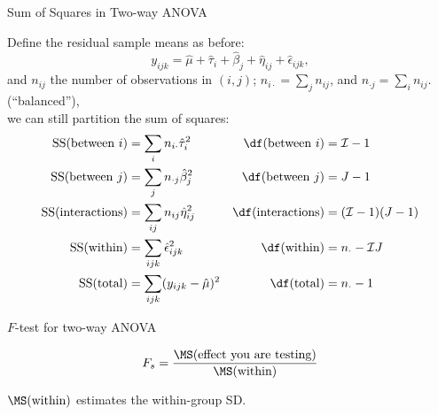 \begin{frame}{Sum of Squares in Two-way ANOVA}

  Define the residual sample means as before:
    \[
    y_{ijk} = \hat \mu + \hat \tau_i + \hat \beta_j + \hat \eta_{ij} + \hat \epsilon_{ijk} ,
    \]
    and $n_{ij}$ the number of observations in $(i,j)$; 
    $n_{i\cdot} = \sum_j n_{ij}$, and 
    $n_{\cdot j} = \sum_i n_{ij}$.
     (``balanced''),\\
    we can still partition the sum of squares:
  \begin{align*}
      \SS(\text{between $i$}) &= \sum_{i} n_{i\cdot} \hat \tau_{i}^2 & \df(\text{between $i$}) &= \mathcal{I}-1 \\
    \SS(\text{between $j$}) &= \sum_{j} n_{\cdot j} \hat \beta_{j}^2 & \df(\text{between $j$}) &= J-1 \\
      \SS(\text{interactions}) &= \sum_{ij} n_{ij} \hat \eta_{ij}^2  & \df(\text{interactions}) &= (\mathcal{I}-1)(J-1) \\
      \SS(\text{within}) &= \sum_{ijk} \hat \epsilon_{ijk}^2  & \df(\text{within}) &= n_{\cdot} - \mathcal{I}J\\
    \SS(\text{total}) &= \sum_{ijk} (y_{ijk}-\hat \mu)^2 & \df(\text{total}) &= n_\cdot - 1  
  \end{align*}

\end{frame}

\begin{frame}{$F$-test for two-way ANOVA}

  \[
  F_s = \frac{ \MS(\text{effect you are testing}) }{ \MS(\text{within}) } 
  \]

    \vspace{2em}

     $\MS(\text{within})$ estimates the within-group SD.

\end{frame}

